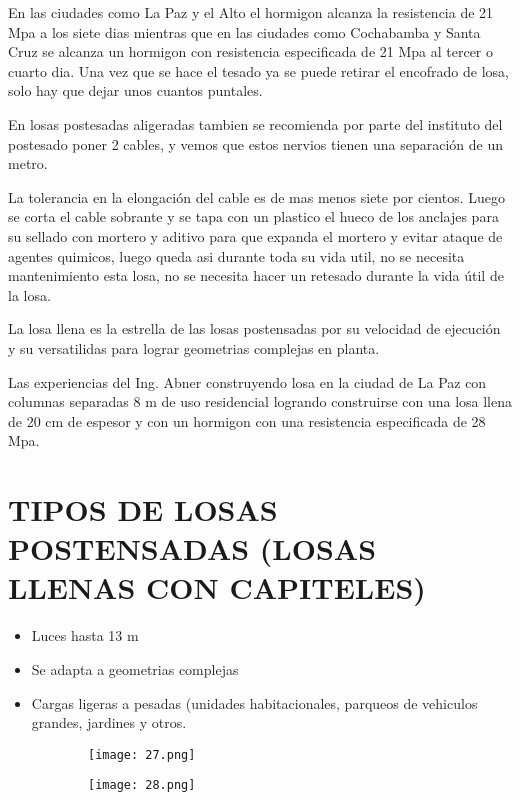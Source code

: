 En las ciudades como La Paz y el Alto el hormigon alcanza la
resistencia de 21 Mpa a los siete dias mientras que en las ciudades
como Cochabamba y Santa Cruz se alcanza un hormigon con resistencia
especificada de 21 Mpa al tercer o cuarto dia. Una vez que se hace el
tesado ya se puede retirar el encofrado de losa, solo hay que dejar unos
cuantos puntales.

En losas postesadas aligeradas tambien se recomienda por parte del
instituto del postesado poner 2 cables, y vemos que estos nervios
tienen una separación de un metro.

La tolerancia en la elongación del cable es de mas menos siete por
cientos. Luego se corta el cable sobrante y se tapa con un plastico
el hueco de los anclajes para su sellado con mortero y aditivo
para que expanda el mortero y evitar ataque de agentes quimicos, luego queda asi
durante toda su vida util, no se necesita mantenimiento esta losa, no
se necesita hacer un retesado durante la vida útil de la losa.

La losa llena es la estrella de las losas postensadas por su velocidad de
ejecución y su versatilidas para lograr geometrias complejas en planta.

Las experiencias del Ing. Abner construyendo losa en la ciudad de La Paz
con columnas separadas 8 m de uso residencial logrando construirse con
una losa llena de 20 cm de espesor y con un hormigon con una resistencia
especificada de 28 Mpa.

\section{TIPOS DE LOSAS POSTENSADAS (LOSAS LLENAS CON CAPITELES)}

\begin{itemize}
	\item Luces hasta 13 m
	\item Se adapta a geometrias complejas
	\item {Cargas ligeras a pesadas (unidades habitacionales, parqueos
		de vehiculos grandes, jardines y otros.}
\end{itemize}

\begin{figure}[H]
	\begin{subfigure}{0.5\textwidth}
	\centering
	\texttt{[image: 27.png]}
	\end{subfigure}
	\begin{subfigure}{0.5\textwidth}
	\centering
	\texttt{[image: 28.png]}
	\end{subfigure}
\end{figure}

